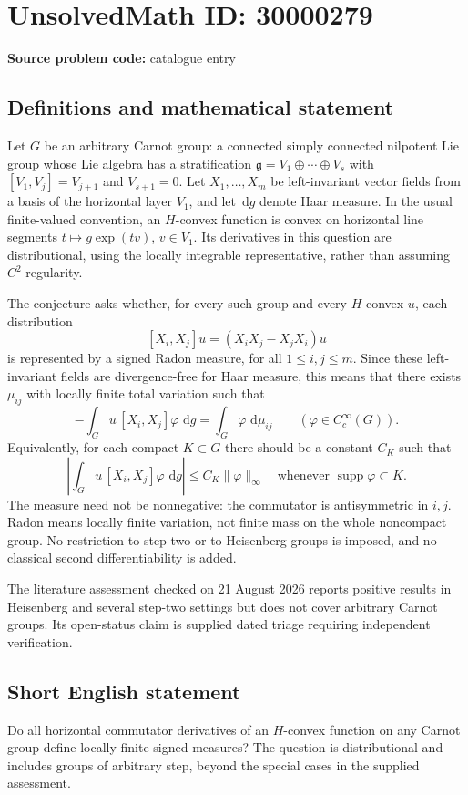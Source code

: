 \documentclass[11pt]{article}
\newcommand{\dd}{\,\mathrm{d}}
\begin{document}
\section*{UnsolvedMath ID: 30000279}
\textbf{Source problem code:} catalogue entry
\subsection{Definitions and mathematical statement}
Let $G$ be an arbitrary Carnot group: a connected simply connected nilpotent Lie group whose Lie algebra has a stratification $\mathfrak g=V_1\oplus\cdots\oplus V_s$ with $[V_1,V_j]=V_{j+1}$ and $V_{s+1}=0$. Let $X_1,\ldots,X_m$ be left-invariant vector fields from a basis of the horizontal layer $V_1$, and let $\dd g$ denote Haar measure. In the usual finite-valued convention, an $H$-convex function is convex on horizontal line segments $t\mapsto g\exp(tv)$, $v\in V_1$. Its derivatives in this question are distributional, using the locally integrable representative, rather than assuming $C^2$ regularity.

The conjecture asks whether, for every such group and every $H$-convex $u$, each distribution
\[
 [X_i,X_j]u=(X_iX_j-X_jX_i)u
\]
is represented by a signed Radon measure, for all $1\le i,j\le m$. Since these left-invariant fields are divergence-free for Haar measure, this means that there exists $\mu_{ij}$ with locally finite total variation such that
\[
 -\int_Gu\,[X_i,X_j]\varphi\,\dd g
       =\int_G\varphi\,\dd\mu_{ij}
 \qquad(\varphi\in C_c^\infty(G)).
\]
Equivalently, for each compact $K\subset G$ there should be a constant $C_K$ such that
\[
 \left|\int_Gu\,[X_i,X_j]\varphi\,\dd g\right|
 \le C_K\|\varphi\|_\infty
 \quad\text{whenever }\operatorname{supp}\varphi\subset K.
\]
The measure need not be nonnegative: the commutator is antisymmetric in $i,j$. Radon means locally finite variation, not finite mass on the whole noncompact group. No restriction to step two or to Heisenberg groups is imposed, and no classical second differentiability is added.

The literature assessment checked on 21 August 2026 reports positive results in Heisenberg and several step-two settings but does not cover arbitrary Carnot groups. Its open-status claim is supplied dated triage requiring independent verification.
\subsection{Short English statement}
Do all horizontal commutator derivatives of an $H$-convex function on any Carnot group define locally finite signed measures? The question is distributional and includes groups of arbitrary step, beyond the special cases in the supplied assessment.
\end{document}
